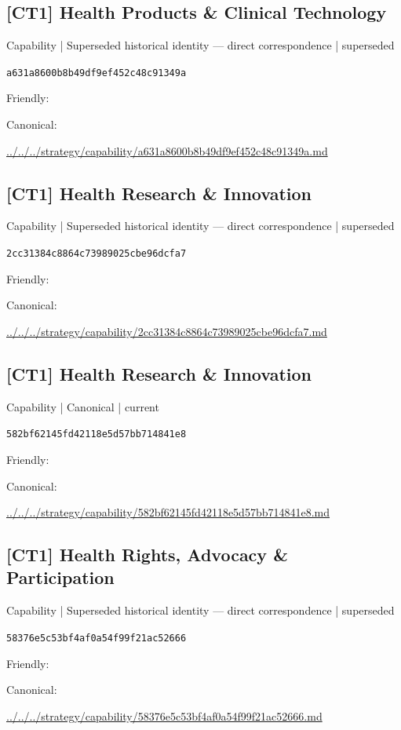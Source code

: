 \documentclass[10pt,a4paper]{article}
\begin{document}
\subsection*{[CT1] Health Products \& Clinical Technology}
{\small Capability | Superseded historical identity — direct correspondence | superseded}\par
\texttt{a631a8600b8b49df9ef452c48c91349a}\par
Friendly: \par
Canonical: \par
{\footnotesize\url{../../../strategy/capability/a631a8600b8b49df9ef452c48c91349a.md}}\par
\subsection*{[CT1] Health Research \& Innovation}
{\small Capability | Superseded historical identity — direct correspondence | superseded}\par
\texttt{2cc31384c8864c73989025cbe96dcfa7}\par
Friendly: \par
Canonical: \par
{\footnotesize\url{../../../strategy/capability/2cc31384c8864c73989025cbe96dcfa7.md}}\par
\subsection*{[CT1] Health Research \& Innovation}
{\small Capability | Canonical | current}\par
\texttt{582bf62145fd42118e5d57bb714841e8}\par
Friendly: \par
Canonical: \par
{\footnotesize\url{../../../strategy/capability/582bf62145fd42118e5d57bb714841e8.md}}\par
\subsection*{[CT1] Health Rights, Advocacy \& Participation}
{\small Capability | Superseded historical identity — direct correspondence | superseded}\par
\texttt{58376e5c53bf4af0a54f99f21ac52666}\par
Friendly: \par
Canonical: \par
{\footnotesize\url{../../../strategy/capability/58376e5c53bf4af0a54f99f21ac52666.md}}\par
\end{document}
